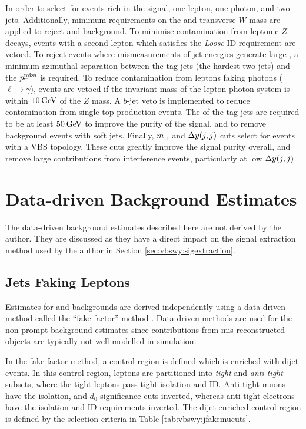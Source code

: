 In order to select for events rich in the \ewwy signal, one lepton, one photon, and two jets. Additionally, minimum requirements on the \met and transverse $W$ mass are applied to reject \jfakee and \jfakemu background. To minimise contamination from leptonic $Z$ decays, events with a second lepton which satisfies the \textit{Loose} ID requirement are vetoed. To reject events where mismeasurements of jet energies generate large \met, a minimum azimuthal separation between the tag jets (the hardest two jets) and the $p_{\text{T}}^{\mathrm{miss}}$ is required. To reduce contamination from leptons faking photons ($\ell\rightarrow\gamma$), events are vetoed if the invariant mass of the lepton-photon system is within $10\hspace{2pt}\text{Ge\kern -0.1em V}$ of the $Z$ mass. A $b$-jet veto is implemented to reduce contamination from single-top production events. The \pt of the tag jets are required to be at least $50\hspace{2pt}\text{Ge\kern -0.1em V}$ to improve the purity of the signal, and to remove background events with soft jets. Finally, $m_{\text{jj}}$ and $\Delta y(j,j)$ cuts select for events with a VBS topology. These cuts greatly improve the \ewwy signal purity overall, and remove large contributions from interference events, particularly at low $\Delta y(j,j)$. 

\section{Data-driven Background Estimates\label{sec:vbswy:nonprompt}}

The data-driven background estimates described here are not derived by the author. They are discussed as they have a direct impact on the signal extraction method used by the author in Section \ref{sec:vbswy:sigextraction}.

\subsection{Jets Faking Leptons}

Estimates for \jfakee and \jfakemu backgrounds are derived independently using a data-driven method called the ``fake factor'' method \cite{VBSWy:fakefactor}. Data driven methods are used for the non-prompt background estimates since contributions from mis-reconstructed objects are typically not well modelled in simulation.

In the fake factor method, a control region is defined which is enriched with dijet events. In this control region, leptons are partitioned into \textit{tight} and \textit{anti-tight} subsets, where the tight leptons pass tight isolation and ID. Anti-tight muons have the isolation, and $d_0$ significance cuts inverted, whereas anti-tight electrons have the isolation and ID requirements inverted. %
The dijet enriched control region is defined by the selection criteria in Table \ref{tab:vbswy:jfakemucuts}.

